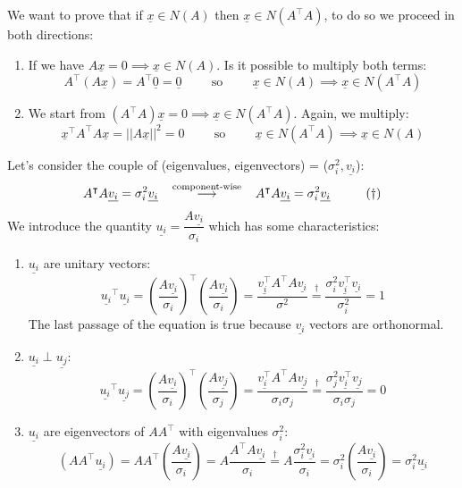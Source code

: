 We want to prove that if  $\underline{x} \in N(A)$ then $\underline{x} \in N(A^\intercal A)$, to do so we proceed in both directions:
\begin{enumerate}
    \item If we have $A\underline{x} = 0 \implies \underline{x} \in N(A)$. Is it possible to multiply both terms:
    \[
        A^\intercal(A\underline{x}) = A^\intercal \underline{0} = \underline{0} \hspace{1cm} \text{so} \hspace{1cm} \underline{x} \in N(A) \implies \underline{x} \in N(A^\intercal A)
    \]
    \item We start from $(A^\intercal A)\underline{x} = 0 \implies \underline{x} \in N(A^\intercal A)$. Again, we multiply:
    \[
        \underline{x}^\intercal A^\intercal A\underline{x} = ||A\underline{x}||^2 = 0 \hspace{1cm} \text{so} \hspace{1cm} \underline{x} \in N(A^\intercal A) \implies \underline{x} \in N(A)
    \]
\end{enumerate}
Let's consider the couple of (eigenvalues, eigenvectors) = ($\sigma_i^2, \underline{v_i}$):
\[
    A^\intercal A\underline{v_i} = \sigma_i^2 \underline{v_i} \hspace{0.3cm}\overset{\text{component-wise}}{\longrightarrow} \hspace{0.3cm} A^\intercal A\underline{v_i} = \sigma_i^2 \underline{v_i} \hspace{1cm} (\dagger)
\]
We introduce the quantity $\underline{u_i} = \dfrac{A\underline{v_i}}{\sigma_i}$ which has some characteristics:
\begin{enumerate}[i]
    \item $\underline{u_i}$ are unitary vectors:
    \[
        \underline{u_i}^\intercal \underline{u_i} = \left(\dfrac{A\underline{v_i}}{\sigma_i}\right)^\intercal \left(\dfrac{A\underline{v_i}}{\sigma_i}\right) = \dfrac{\underline{v_i^\intercal}A^\intercal A\underline{v_i}}{\sigma^2} \overset{\dagger}{=} \dfrac{\sigma_i^2 \underline{v_i^\intercal}\underline{v_i}}{\sigma_i^2} = 1
    \]
    The last passage of the equation is true because $\underline{v_i}$ vectors are orthonormal.
    \item $\underline{u_i} \perp \underline{u_j}$:
    \[
        \underline{u_i}^\intercal \underline{u_j} = \left(\dfrac{A\underline{v_i}}{\sigma_i}\right)^\intercal \left(\dfrac{A\underline{v_j}}{\sigma_j}\right) = \dfrac{\underline{v_i^\intercal}A^\intercal A\underline{v_j}}{\sigma_i \sigma_j} \overset{\dagger}{=} \dfrac{\sigma_j^2 \underline{v_i^\intercal}\underline{v_j}}{\sigma_i \sigma_j} = 0
    \] 
    \item $\underline{u_i}$ are eigenvectors of $AA^\intercal$ with eigenvalues $\sigma_i^2$:
    \[
        (AA^\intercal \underline{u_i}) = AA^\intercal\left(\dfrac{A\underline{v_i}}{\sigma_i}\right) = A\dfrac{A^\intercal A\underline{v_i}}{\sigma_i} \overset{\dagger}{=} A\dfrac{\sigma_i^2 \underline{v_i}}{\sigma_i} = \sigma_i^2\left(\dfrac{A\underline{v_i}}{\sigma_i}\right) = \sigma_i^2\underline{u_i}   
    \]
\end{enumerate}
